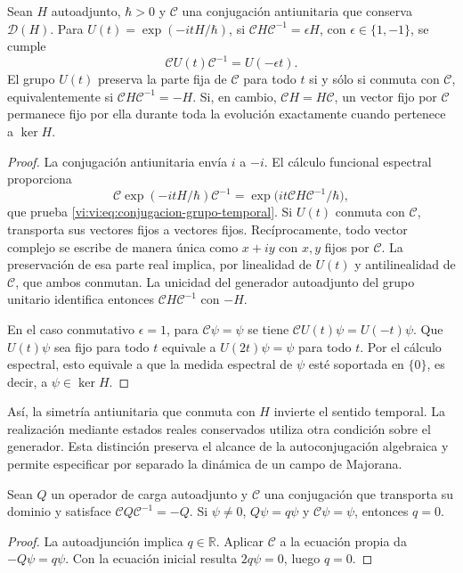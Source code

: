 \begin{proposition}
\label{vi:vi:prop:conjugacion-evolucion}
Sean $H$ autoadjunto, $\hbar>0$ y $\mathcal C$ una conjugación
antiunitaria que conserva $\mathcal D(H)$. Para
$U(t)=\exp(-itH/\hbar)$, si
$\mathcal C H\mathcal C^{-1}=\epsilon H$, con
$\epsilon\in\{1,-1\}$, se cumple
\begin{equation}
 \mathcal C U(t)\mathcal C^{-1}=U(-\epsilon t).
 \label{vi:vi:eq:conjugacion-grupo-temporal}
\end{equation}
El grupo $U(t)$ preserva la parte fija de $\mathcal C$ para todo $t$
si y sólo si conmuta con $\mathcal C$, equivalentemente si
$\mathcal C H\mathcal C^{-1}=-H$.
Si, en cambio, $\mathcal C H=H\mathcal C$, un vector fijo por
$\mathcal C$ permanece fijo por ella durante toda la evolución
exactamente cuando pertenece a $\ker H$.
\end{proposition}
\begin{proof}
La conjugación antiunitaria envía $i$ a $-i$. El cálculo funcional
espectral proporciona
\[
 \mathcal C\exp(-itH/\hbar)\mathcal C^{-1}
 =\exp\bigl(it\mathcal C H\mathcal C^{-1}/\hbar\bigr),
\]
que prueba \eqref{vi:vi:eq:conjugacion-grupo-temporal}. Si $U(t)$ conmuta
con $\mathcal C$, transporta sus vectores fijos a vectores fijos.
Recíprocamente, todo vector complejo se escribe de manera única como
$x+iy$ con $x,y$ fijos por $\mathcal C$. La preservación de esa parte
real implica, por linealidad de $U(t)$ y antilinealidad de
$\mathcal C$, que ambos conmutan. La unicidad del generador
autoadjunto del grupo unitario identifica entonces
$\mathcal C H\mathcal C^{-1}$ con $-H$.

En el caso conmutativo $\epsilon=1$, para $\mathcal C\psi=\psi$
se tiene $\mathcal C U(t)\psi=U(-t)\psi$. Que $U(t)\psi$ sea fijo
para todo $t$ equivale a $U(2t)\psi=\psi$ para todo $t$. Por el
cálculo espectral, esto equivale a que la medida espectral de $\psi$
esté soportada en $\{0\}$, es decir, a $\psi\in\ker H$.
\end{proof}

Así, la simetría antiunitaria que conmuta con $H$ invierte el sentido
temporal. La realización mediante estados reales conservados utiliza
otra condición sobre el generador. Esta distinción preserva el alcance
de la autoconjugación algebraica y permite especificar por separado la
dinámica de un campo de Majorana.

\begin{proposition}
\label{vi:vi:prop:carga-real}
Sean $Q$ un operador de carga autoadjunto y $\mathcal C$ una
conjugación que transporta su dominio y satisface
$\mathcal C Q\mathcal C^{-1}=-Q$. Si $\psi\ne0$,
$Q\psi=q\psi$ y $\mathcal C\psi=\psi$, entonces $q=0$.
\end{proposition}
\begin{proof}
La autoadjunción implica $q\in\mathbb R$. Aplicar $\mathcal C$
a la ecuación propia da $-Q\psi=q\psi$. Con la ecuación inicial
resulta $2q\psi=0$, luego $q=0$.
\end{proof}


